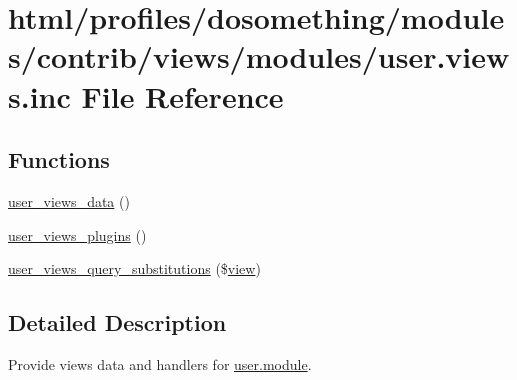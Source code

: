 \hypertarget{user_8views_8inc}{
\section{html/profiles/dosomething/modules/contrib/views/modules/user.views.inc File Reference}
\label{user_8views_8inc}
}
\subsection*{Functions}
\begin{DoxyCompactItemize}
\item 
\hyperlink{user_8views_8inc_a8de9e9f62db27dac6f5778d4362a7dc2}{user\_\-views\_\-data} ()
\item 
\hyperlink{user_8views_8inc_aa36ee99043e81c01d59f8f7c47d310d1}{user\_\-views\_\-plugins} ()
\item 
\hyperlink{user_8views_8inc_ae3007fb2a7423125b3458d4018293eba}{user\_\-views\_\-query\_\-substitutions} (\$\hyperlink{classview}{view})
\end{DoxyCompactItemize}


\subsection{Detailed Description}
Provide views data and handlers for \hyperlink{user_8module}{user.module}. 

